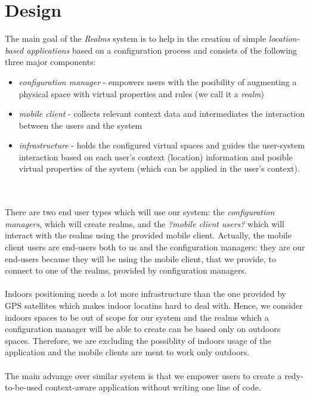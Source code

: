 \section{Design} %
\label{sec:design}
The main goal of the \emph{Realms} system is to help in the creation of simple \emph{location-based applications} based on a configuration process and consists of the following three major components:
\begin{itemize}
	\item \emph{configuration manager} - empowers users with the posibility of augmenting a physical space with virtual properties and rules (we call it a \emph{realm})
	\item \emph{mobile client} - collects relevant context data and intermediates the interaction between the users and the system
	\item \emph{infrastructure} - holds the configured virtual spaces and guides the user-system interaction based on each user's context (location) information and posible virtual properties of the system (which can be applied in the user's context).
\end{itemize}
\\\\
There are two end user types which will use our system: the \emph{configuration managers}, which will create realms, and the \emph{?mobile client users?} which will interact with the realms using the provided mobile client. Actually, the mobile client users are end-users both to us and the configuration managers: they are our end-users because they will be using the mobile client, that we provide, to connect to one of the realms, provided by configuration managers.
\\\\
Indoors positioning needs a lot more infrastructure than the one provided by GPS satellites which makes indoor locatins hard to deal with. Hence, we consider indoors spaces to be out of scope for our system and the realms which a configuration manager will be able to create can be based only on outdoors spaces. Therefore, we are excluding the possiblity of indoors usage of the application and the mobile clients are ment to work only outdoors.
\\\\
The main advange over similar system is that we empower users to create a redy-to-be-used context-aware application without writing one line of code.\\
\\\\
